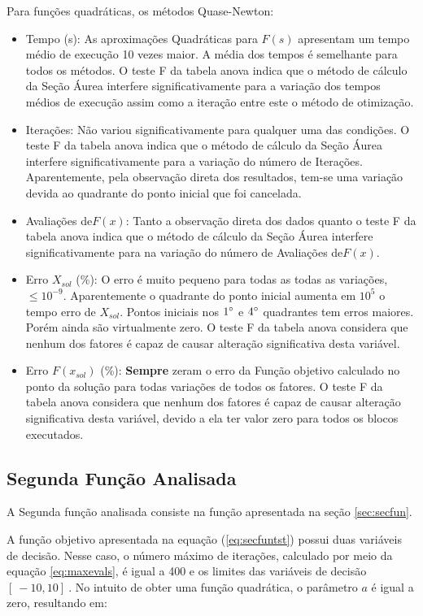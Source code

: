             Para funções quadráticas, os métodos Quase-Newton:
            \begin{itemize}
            \item {Tempo (s):} As aproximações Quadráticas para $F(s)$ apresentam um tempo médio de execução 10 vezes maior. A média dos tempos é semelhante para todos os métodos. O teste F da tabela anova indica que o método de cálculo da Seção Áurea interfere significativamente para a variação dos tempos médios de execução assim como a iteração entre este o método de otimização. 
            \item {Iterações:} Não variou significativamente para qualquer uma das condições. O teste F da tabela anova indica que o método de cálculo da Seção Áurea interfere significativamente para a variação do número de Iterações. Aparentemente, pela observação direta dos resultados, tem-se uma variação devida ao quadrante do ponto inicial que foi cancelada.
            \item {Avaliações de$F(x)$:} Tanto a observação direta dos dados quanto o teste F da tabela anova indica que o método de cálculo da Seção Áurea interfere significativamente para na variação do número de Avaliações de$F(x)$.
            \item {Erro $X_{sol}$ (\%):} O erro é muito pequeno para todas as todas as variações, $\leq 10^{-9}$. Aparentemente o quadrante do ponto inicial aumenta em $10^5$ o tempo erro de $X_{sol}$. Pontos iniciais nos $1\degree$ e $4\degree$ quadrantes tem erros maiores. Porém ainda são virtualmente zero. O teste F da tabela anova considera que nenhum dos fatores é capaz de causar alteração significativa desta variável.
            \item {Erro $F(x_{sol})$ (\%):} \textbf{Sempre} zeram o erro da Função objetivo calculado no ponto da solução para todas variações de todos os fatores. O teste F da tabela anova considera que nenhum dos fatores é capaz de causar alteração significativa desta variável, devido a ela ter valor zero para todos os blocos executados.
            \end{itemize}
            
    \subsection{Segunda Função Analisada}

    A Segunda função analisada consiste na função apresentada na seção \ref{sec:secfun}.

    A função objetivo apresentada na equação (\ref{eq:secfuntst}) possui duas variáveis de decisão. Nesse caso, o número máximo de iterações, calculado por meio da equação \ref{eq:maxevals}, é igual a 400 e os limites das variáveis de decisão $[\ -10 , 10 ]\ $. No intuito de obter uma função quadrática, o parâmetro $a$ é igual a zero, resultando em:

